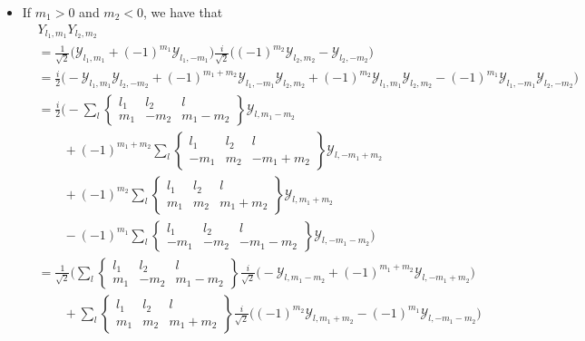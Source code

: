 \documentclass[10pt]{article}
\begin{document}
\begin{itemize}
		\item If $m_1 > 0$ and $m_2 < 0$, we have that
		\begin{align*}
			& Y_{l_1, m_1} Y_{l_2, m_2}\\
			& = \frac{1}{\sqrt{2}} \bigg( \mathcal{Y}_{l_1, m_1} + (-1)^{m_1} \mathcal{Y}_{l_1, -m_1} \bigg)
			\frac{i}{\sqrt{2}} \bigg( (-1)^{m_2} \mathcal{Y}_{l_2, m_2} - \mathcal{Y}_{l_2, -m_2} \bigg) \\
			& = \frac{i}{2} \bigg( 
			- \mathcal{Y}_{l_1, m_1} \mathcal{Y}_{l_2, -m_2}
			+ (-1)^{m_1+m_2} \mathcal{Y}_{l_1, -m_1} \mathcal{Y}_{l_2, m_2}
			+ (-1)^{m_2} \mathcal{Y}_{l_1, m_1} \mathcal{Y}_{l_2, m_2}
			- (-1)^{m_1} \mathcal{Y}_{l_1, -m_1} \mathcal{Y}_{l_2, -m_2}
			\bigg) \\
			& = \frac{i}{2} \bigg( 
			- \sum_{l} \begin{Bmatrix} l_1 & l_2 & l \\ m_1 & -m_2 & m_1 - m_2 \end{Bmatrix} \mathcal{Y}_{l, m_1-m_2} \\
			& \qquad + (-1)^{m_1+m_2} \sum_{l} \begin{Bmatrix} l_1 & l_2 & l \\ -m_1 & m_2 & -m_1 + m_2 \end{Bmatrix} \mathcal{Y}_{l, -m_1+m_2} \\
			& \qquad + (-1)^{m_2} \sum_{l} \begin{Bmatrix} l_1 & l_2 & l \\ m_1 & m_2 & m_1 + m_2 \end{Bmatrix} \mathcal{Y}_{l, m_1+m_2} \\
			& \qquad - (-1)^{m_1} \sum_{l} \begin{Bmatrix} l_1 & l_2 & l \\ -m_1 & -m_2 & -m_1 - m_2 \end{Bmatrix} \mathcal{Y}_{l, -m_1-m_2}
			\bigg) \\
			& = \frac{1}{\sqrt{2}} \bigg( 
			 \sum_{l} \begin{Bmatrix} l_1 & l_2 & l \\ m_1 & -m_2 & m_1 - m_2 \end{Bmatrix}\frac{i}{\sqrt{2}} \bigg( - \mathcal{Y}_{l, m_1-m_2} + (-1)^{m_1+m_2} \mathcal{Y}_{l, -m_1+m_2}  \bigg) \\			
			& \qquad + \sum_{l} \begin{Bmatrix} l_1 & l_2 & l \\ m_1 & m_2 & m_1 + m_2 \end{Bmatrix} \frac{i}{\sqrt{2}} \bigg( (-1)^{m_2} \mathcal{Y}_{l, m_1+m_2}  - (-1)^{m_1}\mathcal{Y}_{l, -m_1-m_2} \bigg)

\end{align*}
\end{itemize}
\end{document}
